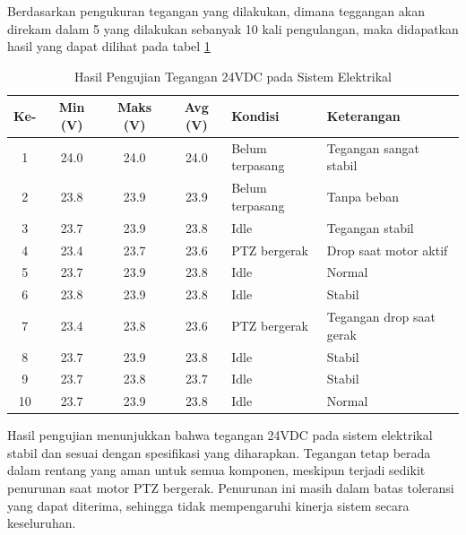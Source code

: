Berdasarkan pengukuran tegangan yang dilakukan, dimana teggangan akan direkam
dalam 5 yang dilakukan sebanyak 10 kali pengulangan, maka didapatkan hasil yang dapat
dilihat pada tabel \ref{tab:pengujian_tegangan}
\begin{table}[H]
	\centering
	\caption{Hasil Pengujian Tegangan 24VDC pada Sistem Elektrikal}
	\label{tab:pengujian_tegangan}
	\begin{tabular}{|c|c|c|c|l|l|}
		\hline
		\textbf{Ke-} & \textbf{Min (V)} & \textbf{Maks (V)} & \textbf{Avg (V)} & \textbf{Kondisi} & \textbf{Keterangan}      \\
		\hline
		1            & 24.0             & 24.0              & 24.0             & Belum terpasang  & Tegangan sangat stabil   \\
		2            & 23.8             & 23.9              & 23.9             & Belum terpasang  & Tanpa beban              \\
		3            & 23.7             & 23.9              & 23.8             & Idle             & Tegangan stabil          \\
		4            & 23.4             & 23.7              & 23.6             & PTZ bergerak     & Drop saat motor aktif    \\
		5            & 23.7             & 23.9              & 23.8             & Idle             & Normal                   \\
		6            & 23.8             & 23.9              & 23.8             & Idle             & Stabil                   \\
		7            & 23.4             & 23.8              & 23.6             & PTZ bergerak     & Tegangan drop saat gerak \\
		8            & 23.7             & 23.9              & 23.8             & Idle             & Stabil                   \\
		9            & 23.7             & 23.8              & 23.7             & Idle             & Stabil                   \\
		10           & 23.7             & 23.9              & 23.8             & Idle             & Normal                   \\
		\hline
	\end{tabular}
\end{table}

Hasil pengujian menunjukkan bahwa tegangan 24VDC pada sistem elektrikal stabil
dan sesuai dengan spesifikasi yang diharapkan. Tegangan tetap berada dalam rentang
yang aman untuk semua komponen, meskipun terjadi sedikit penurunan saat motor
PTZ bergerak. Penurunan ini masih dalam batas toleransi yang dapat diterima,
sehingga tidak mempengaruhi kinerja sistem secara keseluruhan.

